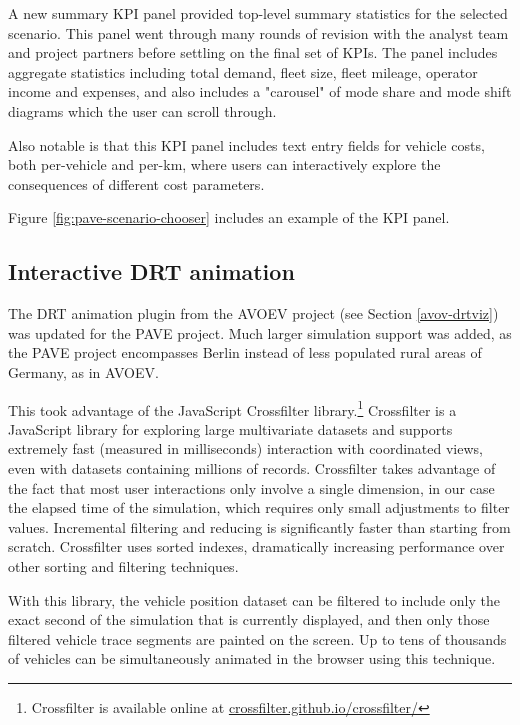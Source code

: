 A new summary \gls{KPI} panel provided top-level summary statistics for the selected scenario. This panel went through many rounds of revision with the analyst team and project partners before settling on the final set of KPIs. The panel includes aggregate statistics including total demand, fleet size, fleet mileage, operator income and expenses, and also includes a "carousel" of mode share and mode shift diagrams which the user can scroll through.

Also notable is that this KPI panel includes text entry fields for vehicle costs, both per-vehicle and per-km, where users can interactively explore the consequences of different cost parameters.

Figure \ref{fig:pave-scenario-chooser} includes an example of the KPI panel.

\subsection{Interactive DRT animation}
\label{pave-drt-animation}

The DRT animation plugin from the AVOEV project (see Section \ref{avov-drtviz}) was updated for the PAVE project. Much larger simulation support was added, as the PAVE project encompasses Berlin instead of less populated rural areas of Germany, as in AVOEV.

This took advantage of the JavaScript Crossfilter library.\footnote{Crossfilter is available online at \href{https://crossfilter.github.io/crossfilter/}{crossfilter.github.io/crossfilter/}} Crossfilter is a JavaScript library for exploring large multivariate datasets and supports extremely fast (measured in milliseconds) interaction with coordinated views, even with datasets containing millions of records. Crossfilter takes advantage of the fact that most user interactions only involve a single dimension, in our case the elapsed time of the simulation, which requires only small adjustments to filter values. Incremental filtering and reducing is significantly faster than starting from scratch. Crossfilter uses sorted indexes, dramatically increasing perfor­mance over other sorting and filtering techniques.

With this library, the vehicle position dataset can be filtered to include only the exact second of the simulation that is currently displayed, and then only those filtered vehicle trace segments are painted on the screen. Up to tens of thousands of vehicles can be simultaneously animated in the browser using this technique.

